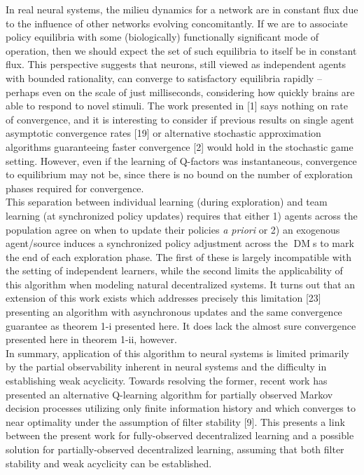 \documentclass[10pt]{article}
\newcommand{\1}[1]{\mathbbm{1}_{#1}}
\DeclareMathOperator{\DM}{DM}
\begin{document}
In real neural systems, the milieu dynamics for a network are in constant flux due to the influence of other networks evolving concomitantly. If we are to associate policy equilibria with some (biologically) functionally significant mode of operation, then we should expect the set of such equilibria to itself be in constant flux. This perspective suggests that neurons, still viewed as independent agents with
bounded rationality, can converge to satisfactory equilibria rapidly -- perhaps even on the scale of just milliseconds, considering how quickly brains are able to respond to novel stimuli. The work presented in [1] says nothing on rate of convergence, and it is interesting to consider if previous results on single agent asymptotic convergence rates [19] or alternative stochastic approximation
algorithms guaranteeing faster convergence [2] would hold in the stochastic game setting. However, even if the learning of Q-factors was instantaneous, convergence to equilibrium may not be, since there is no bound on the number of exploration phases required for convergence. \\[5pt]
This separation between individual learning (during exploration) and team learning (at synchronized policy updates) requires that either 1) agents across the population agree on when to update their policies {\it a priori} or 2) an exogenous agent/source induces a synchronized policy adjustment across the $\DM$s to mark the end of each exploration phase. The first of these is largely incompatible with the setting of independent learners, while the second
limits the applicability of this algorithm when modeling natural decentralized systems. It turns out that an extension of this work exists which addresses precisely this limitation [23] presenting an algorithm with asynchronous updates and the same convergence guarantee as theorem 1-i presented here. It does lack the almost sure convergence presented here in theorem 1-ii, however.\\[5pt]
In summary, application of this algorithm to neural systems is limited primarily by the partial observability inherent in neural systems and the difficulty in establishing weak acyclicity. Towards resolving the former, recent work has presented an alternative Q-learning algorithm for partially observed Markov decision processes utilizing only finite information history and which converges to near optimality under the assumption of filter stability [9].
This presents a link between the present work for fully-observed decentralized learning and a possible solution for partially-observed decentralized learning, assuming that both filter stability and weak acyclicity can be established.  
\end{document}
